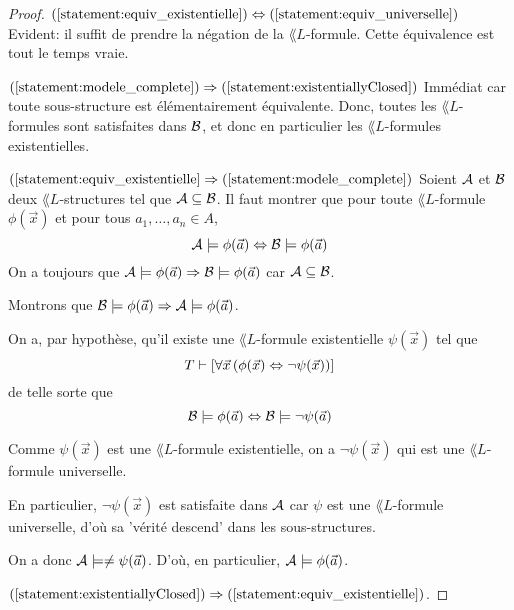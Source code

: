 \documentclass[a4paper, 12pt]{report}
\begin{document}
\ifdefined\outputproof
\begin{proof}
	$(\ref{statement:equiv_existentielle}) \Leftrightarrow
	(\ref{statement:equiv_universelle})$ Evident: il suffit de prendre la
	négation de la $\lang{L}$-formule. Cette équivalence est tout le temps vraie.

	$(\ref{statement:modele_complete}) \implies
	(\ref{statement:existentiallyClosed})$ Immédiat car toute sous-structure est
	élémentairement équivalente. Donc, toutes les $\lang{L}$-formules sont
	satisfaites dans $\struct{B}$, et donc en particulier les $\lang{L}$-formules existentielles.

	$(\ref{statement:equiv_existentielle} \implies
	(\ref{statement:modele_complete})$
	Soient $\struct{A}$ et $\struct{B}$
	deux $\lang{L}$-structures tel que $\struct{A} \substructure \struct{B}$. Il
	faut montrer que pour toute $\lang{L}$-formule $\phi(\vec{x})$ et pour tous
	$a_{1}, \dots, a_{n} \in A$,
	\begin{equation}
		\struct{A} \models \phi(\vec{a}) \Leftrightarrow \struct{B}
		\models \phi(\vec{a})
	\end{equation}
	On a toujours que $\struct{A} \models \phi(\vec{a}) \implies \struct{B}
	\models \phi(\vec{a})$ car $\struct{A} \substructure \struct{B}$.

	Montrons que $\struct{B} \models \phi(\vec{a}) \implies \struct{A} \models
	\phi(\vec{a})$.

	On a, par hypothèse, qu'il existe une $\lang{L}$-formule existentielle
	$\psi(\vec{x})$ tel que
	\begin{equation}
		T \satisfies [\forall \vec{x} \, (\phi(\vec{x}) \Leftrightarrow \neg
		\psi(\vec{x}))]
	\end{equation}
	de telle sorte que
	\begin{equation}
		\struct{B} \models \phi(\vec{a}) \Leftrightarrow \struct{B} \models
		\neg \psi(\vec{a})
	\end{equation}

	Comme $\psi(\vec{x})$ est une $\lang{L}$-formule existentielle, on a
	$\neg \psi(\vec{x})$ qui est une $\lang{L}$-formule universelle.

	En particulier, $\neg \psi(\vec{x})$ est satisfaite dans $\struct{A}$ car
	$\psi$ est une $\lang{L}$-formule universelle, d'où sa 'vérité descend' dans
	les sous-structures.

	On a donc $\struct{A} \models \neq \psi(\vec{a})$. D'où, en particulier,
	$\struct{A} \models \phi(\vec{a})$.

	$(\ref{statement:existentiallyClosed}) \implies
	(\ref{statement:equiv_existentielle})$.
\end{proof}
\fi
\end{document}
